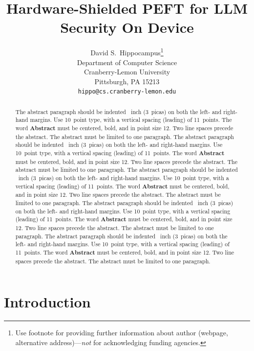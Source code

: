 \documentclass{article}
\title{Hardware-Shielded PEFT for LLM Security On Device}
\author{%
  David S.~Hippocampus\thanks{Use footnote for providing further information
    about author (webpage, alternative address)---\emph{not} for acknowledging
    funding agencies.} \\
  Department of Computer Science\\
  Cranberry-Lemon University\\
  Pittsburgh, PA 15213 \\
  \texttt{hippo@cs.cranberry-lemon.edu} \\
}
\begin{document}
\maketitle


\begin{abstract}
  The abstract paragraph should be indented ~inch (3~picas) on
  both the left- and right-hand margins. Use 10~point type, with a vertical
  spacing (leading) of 11~points.  The word \textbf{Abstract} must be centered,
  bold, and in point size 12. Two line spaces precede the abstract. The abstract
  must be limited to one paragraph.
  The abstract paragraph should be indented ~inch (3~picas) on
  both the left- and right-hand margins. Use 10~point type, with a vertical
  spacing (leading) of 11~points.  The word \textbf{Abstract} must be centered,
  bold, and in point size 12. Two line spaces precede the abstract. The abstract
  must be limited to one paragraph.
  The abstract paragraph should be indented ~inch (3~picas) on
  both the left- and right-hand margins. Use 10~point type, with a vertical
  spacing (leading) of 11~points.  The word \textbf{Abstract} must be centered,
  bold, and in point size 12. Two line spaces precede the abstract. The abstract
  must be limited to one paragraph.
  The abstract paragraph should be indented ~inch (3~picas) on
  both the left- and right-hand margins. Use 10~point type, with a vertical
  spacing (leading) of 11~points.  The word \textbf{Abstract} must be centered,
  bold, and in point size 12. Two line spaces precede the abstract. The abstract
  must be limited to one paragraph.
  The abstract paragraph should be indented ~inch (3~picas) on
  both the left- and right-hand margins. Use 10~point type, with a vertical
  spacing (leading) of 11~points.  The word \textbf{Abstract} must be centered,
  bold, and in point size 12. Two line spaces precede the abstract. The abstract
  must be limited to one paragraph.
\end{abstract}


\section{Introduction}

\end{document}
